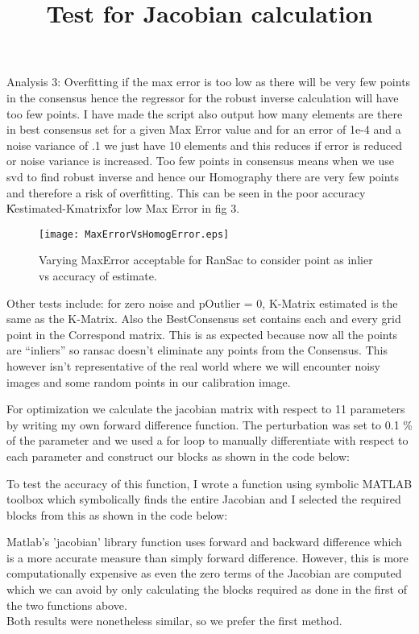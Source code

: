 \documentclass[titlepage]{article}
\begin{document}
Analysis 3: Overfitting if the max error is too low as there will be very few points in the consensus hence the regressor for the robust inverse calculation will have too few points.
I have made the script also output how many elements are there in best consensus set for a given Max Error value and for an error of 1e-4 and a noise variance of .1 we just have 10 elements and this reduces if error is reduced or noise variance is increased. Too few points in consensus means when we use svd to find robust inverse and hence our Homography there are very few points and therefore a risk of overfitting. This can be seen in the poor accuracy \|\|Kestimated-Kmatrix\|\| for low Max Error in fig 3.
\begin{wrapfigure}{R}{5.5cm}
\caption{Varying MaxError acceptable for RanSac to consider point as inlier vs accuracy of estimate.}\label{wrap-fig:1}
\texttt{[image: MaxErrorVsHomogError.eps]}
\end{wrapfigure} 
Other tests include: for zero noise and pOutlier = 0, K-Matrix estimated is the same as the K-Matrix. Also the BestConsensus set contains each and every grid point in the Correspond matrix. This is as expected because now all the points are “inliers” so ransac doesn't eliminate any points from the Consensus. This however isn't representative of the real world where we will encounter noisy images and some random points in our calibration image.\\
\title{Test for Jacobian calculation} 
 For optimization we calculate the jacobian matrix with respect to 11 parameters by writing my own forward difference function. The perturbation was set to 0.1 \% of the parameter and we used a for loop to manually differentiate with respect to each parameter and construct our blocks as shown in the code below:


 To test the accuracy of this function, I wrote a function using symbolic MATLAB toolbox which symbolically finds the entire Jacobian and I selected the required blocks from this as shown in the code below:

Matlab's 'jacobian' library function uses forward and backward difference which is a more accurate measure than simply forward difference. However, this is more computationally expensive as even the zero terms of the Jacobian are computed which we can avoid by only calculating the blocks required as done in the first of the two functions above.\\
Both results were nonetheless similar, so we prefer the first method.
\end{document}
